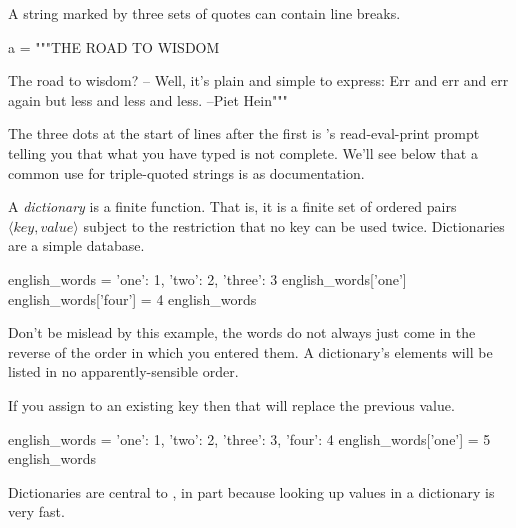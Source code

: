 A string marked by three sets of quotes can contain line breaks.
\begin{pythonoutput}
a = """THE ROAD TO WISDOM
 
The road to wisdom?
-- Well, it's plain
and simple to express:
Err
and err
and err again
but less
and less
and less. --Piet Hein"""
\end{pythonoutput}
\noindent 
The three dots at the start of lines after the first
is \python's
read-eval-print prompt telling you that what you have typed is not complete.
We'll see below that a common use for
triple-quoted strings is as documentation.

A \python{} \textit{dictionary} is a finite function.
That is, it is a finite
set of ordered pairs $\langle\textit{key},\textit{value}\rangle$ subject 
to the restriction that no key can be used twice.
Dictionaries are a simple database.
\begin{pythonoutput}
english_words = {'one': 1, 'two': 2, 'three': 3}
english_words['one']
english_words['four'] = 4  
english_words
\end{pythonoutput}
\noindent Don't be mislead by this example, 
the words do not always just come in the reverse of the order
in which you entered them.
A dictionary's elements will be listed in 
no apparently-sensible order.

If you assign to an existing key then that will replace the previous value. 
\begin{pythonoutput}[d,0,1]
english_words = {'one': 1, 'two': 2, 'three': 3, 'four': 4}
english_words['one'] = 5
english_words
\end{pythonoutput}
\noindent 
Dictionaries are central to \python, in part because looking up values 
in a dictionary is very fast.

